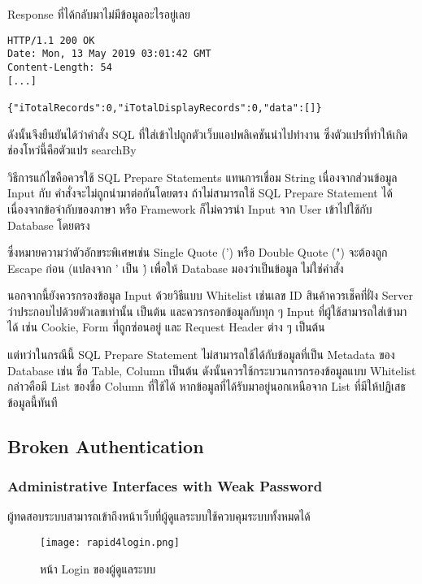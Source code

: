 Response ที่ได้กลับมาไม่มีข้อมูลอะไรอยู่เลย

\begin{lstlisting}[numbers=none] 
HTTP/1.1 200 OK
Date: Mon, 13 May 2019 03:01:42 GMT
Content-Length: 54
[...]

{"iTotalRecords":0,"iTotalDisplayRecords":0,"data":[]}
\end{lstlisting}

ดังนั้นจึงยืนยันได้ว่าคำสั่ง SQL ที่ใส่เข้าไปถูกตัวเว็บแอปพลิเคชันนำไปทำงาน ซึ่งตัวแปรที่ทำให้เกิดช่องโหว่นี้คือตัวแปร searchBy

วิธีการแก้ไขคือควรใช้ SQL Prepare Statements แทนการเชื่อม String เนื่องจากส่วนข้อมูล Input กับ คำสั่งจะไม่ถูกนำมาต่อกันโดยตรง ถ้าไม่สามารถใช้ SQL Prepare Statement ได้ เนื่องจากข้อจำกับของภาษา หรือ Framework ก็ไม่ควรนำ Input จาก User เข้าไปใช้กับ Database โดยตรง

ซึ่งหมายความว่าตัวอักขระพิเศษเช่น Single Quote (') หรือ Double Quote (") จะต้องถูก Escape ก่อน (แปลงจาก ' เป็น \') เพื่อให้ Database มองว่าเป็นข้อมูล ไม่ใช่คำสั่ง

นอกจากนี้ยังควรกรองข้อมูล Input ด้วยวิธีแบบ Whitelist เช่นเลข ID สินค้าควรเช็คที่ฝั่ง Server ว่าประกอบไปด้วยตัวเลขเท่านั้น เป็นต้น และควรกรอกข้อมูลกับทุก ๆ Input ที่ผู้ใช้สามารถใส่เข้ามาได้ เช่น Cookie, Form ที่ถูกซ่อนอยู่ และ Request Header ต่าง ๆ เป็นต้น

แต่ทว่าในกรณีนี้ SQL Prepare Statement ไม่สามารถใช้ได้กับข้อมูลที่เป็น Metadata ของ Database เช่น ชื่อ Table, Column เป็นต้น ดังนั้นควรใช้กระบวนการกรองข้อมูลแบบ Whitelist กล่าวคือมี List ของชื่อ Column ที่ใช้ได้ หากข้อมูลที่ได้รับมาอยู่นอกเหนือจาก List ที่มีให้ปฏิเสธข้อมูลนี้ทันที

\subsection{Broken Authentication}

\subsubsection{	Administrative Interfaces with Weak Password}

ผู้ทดสอบระบบสามารถเข้าถึงหน้าเว็บที่ผู้ดูแลระบบใช้ควบคุมระบบทั้งหมดได้

 \begin{figure}[h]
	\centering
	\texttt{[image: rapid4login.png]}
	\caption{หน้า Login ของผู้ดูแลระบบ}
	\label{Fig:rapid4login.png}
\end{figure}

